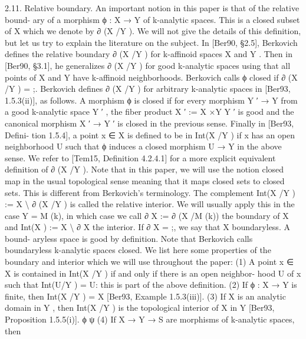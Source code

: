 \documentclass[
  10pt,
]{article}
\newenvironment{Shaded}{}{}
\newcommand{\NormalTok}[1]{#1}
\begin{document}
\begin{Shaded}
\begin{Highlighting}[]
\NormalTok{2.11. Relative boundary. An important notion in this paper is that of the relative bound{-}}
\NormalTok{ary of a morphism ϕ : X → Y of k{-}analytic spaces. This is a closed subset of X which we}
\NormalTok{denote by ∂ (X /Y ). We will not give the details of this definition, but let us try to explain}
\NormalTok{the literature on the subject. In [Ber90, §2.5], Berkovich defines the relative boundary}
\NormalTok{∂ (X /Y ) for k{-}affinoid spaces X and Y . Then in [Ber90, §3.1], he generalizes ∂ (X /Y ) for}
\NormalTok{good k{-}analytic spaces using that all points of X and Y have k{-}affinoid neighborhoods.}
\NormalTok{Berkovich calls ϕ closed if ∂ (X /Y ) = ;. Berkovich defines ∂ (X /Y ) for arbitrary k{-}analytic}
\NormalTok{spaces in [Ber93, 1.5.3(ii)], as follows. A morphism ϕ is closed if for every morphism}
\NormalTok{Y ′ → Y from a good k{-}analytic space Y ′ , the fiber product X ′ := X ×Y Y ′ is good and the}
\NormalTok{canonical morphism X ′ → Y ′ is closed in the previous sense. Finally in [Ber93, Defini{-}}
\NormalTok{tion 1.5.4], a point x ∈ X is defined to be in Int(X /Y ) if x has an open neighborhood U}
\NormalTok{such that ϕ induces a closed morphism U → Y in the above sense. We refer to [Tem15,}
\NormalTok{Definition 4.2.4.1] for a more explicit equivalent definition of ∂ (X /Y ). Note that in this}
\NormalTok{paper, we will use the notion closed map in the usual topological sense meaning that it}
\NormalTok{maps closed sets to closed sets. This is different from Berkovich’s terminology.}
\NormalTok{   The complement Int(X /Y ) := X \textbackslash{} ∂ (X /Y ) is called the relative interior. We will usually}
\NormalTok{apply this in the case Y = M (k), in which case we call ∂ X := ∂ (X /M (k)) the boundary}
\NormalTok{of X and Int(X ) := X \textbackslash{} ∂ X the interior. If ∂ X = ;, we say that X boundaryless. A bound{-}}
\NormalTok{aryless space is good by definition. Note that Berkovich calls boundaryless k{-}analytic}
\NormalTok{spaces closed.}
\NormalTok{   We list here some properties of the boundary and interior which we will use throughout}
\NormalTok{the paper:}
\NormalTok{   (1) A point x ∈ X is contained in Int(X /Y ) if and only if there is an open neighbor{-}}
\NormalTok{       hood U of x such that Int(U/Y ) = U: this is part of the above definition.}
\NormalTok{   (2) If ϕ : X → Y is finite, then Int(X /Y ) = X [Ber93, Example 1.5.3(iii)].}
\NormalTok{   (3) If X is an analytic domain in Y , then Int(X /Y ) is the topological interior of X in}
\NormalTok{       Y [Ber93, Proposition 1.5.5(i)].}
\NormalTok{             ϕ     ψ}
\NormalTok{   (4) If X → Y → S are morphisms of k{-}analytic spaces, then}


\end{Highlighting}
\end{Shaded}
\end{document}
